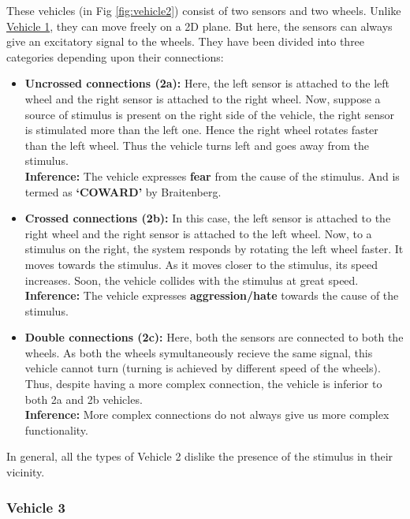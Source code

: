         These vehicles (in Fig \ref{fig:vehicle2}) consist of two sensors and two wheels. Unlike \hyperref[sec:Vehicle_1]{Vehicle 1}, they can move freely on a 2D plane. But here, the sensors can always give an excitatory signal to the wheels. They have been divided into three categories depending upon their connections:

        \begin{itemize}
            \item \textbf{Uncrossed connections (2a):} Here, the left sensor is attached to the left wheel and the right sensor is attached to the right wheel. Now, suppose a source of stimulus is present on the right side of the vehicle, the right sensor is stimulated more than the left one. Hence the right wheel rotates faster than the left wheel. Thus the vehicle turns left and goes away from the stimulus.\\
            \textbf{Inference:} The vehicle expresses \textbf{fear} from the cause of the stimulus. And is termed as \textbf{`COWARD'} by Braitenberg.
            \item \textbf{Crossed connections (2b):} In this case, the left sensor is attached to the right wheel and the right sensor is attached to the left wheel. Now, to a stimulus on the right, the system responds by rotating the left wheel faster. It moves towards the stimulus. As it moves closer to the stimulus, its speed increases. Soon, the vehicle collides with the stimulus at great speed.\\
            \textbf{Inference:} The vehicle expresses \textbf{aggression/hate} towards the cause of the stimulus.
            \item \textbf{Double connections (2c):} Here, both the sensors are connected to both the wheels. As both the wheels symultaneously recieve the same signal, this vehicle cannot turn (turning is achieved by different speed of the wheels). Thus, despite having a more complex connection, the vehicle is inferior to both 2a and 2b vehicles.\\
            \textbf{Inference:} More complex connections do not always give us more complex functionality.
        \end{itemize}

        In general, all the types of Vehicle 2 dislike the presence of the stimulus in their vicinity.

    \subsubsection{Vehicle 3}
    \label{sec:Vehicle_3}

